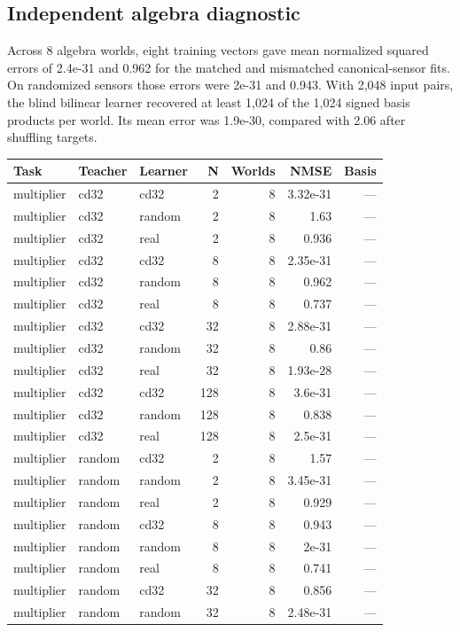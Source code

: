 \documentclass[10pt]{article}
\begin{document}
\subsection*{Independent algebra diagnostic}
Across 8 algebra worlds, eight training vectors gave mean normalized squared errors of 2.4e-31 and 0.962 for the matched and mismatched canonical-sensor fits. On randomized sensors those errors were 2e-31 and 0.943. With 2,048 input pairs, the blind bilinear learner recovered at least 1,024 of the 1,024 signed basis products per world. Its mean error was 1.9e-30, compared with 2.06 after shuffling targets.
\begin{longtable}{lllrrrr}
\hline Task & Teacher & Learner & N & Worlds & NMSE & Basis\\\hline\endhead\hline\endfoot
multiplier & cd32 & cd32 & 2 & 8 & 3.32e-31 & ---\\
multiplier & cd32 & random & 2 & 8 & 1.63 & ---\\
multiplier & cd32 & real & 2 & 8 & 0.936 & ---\\
multiplier & cd32 & cd32 & 8 & 8 & 2.35e-31 & ---\\
multiplier & cd32 & random & 8 & 8 & 0.962 & ---\\
multiplier & cd32 & real & 8 & 8 & 0.737 & ---\\
multiplier & cd32 & cd32 & 32 & 8 & 2.88e-31 & ---\\
multiplier & cd32 & random & 32 & 8 & 0.86 & ---\\
multiplier & cd32 & real & 32 & 8 & 1.93e-28 & ---\\
multiplier & cd32 & cd32 & 128 & 8 & 3.6e-31 & ---\\
multiplier & cd32 & random & 128 & 8 & 0.838 & ---\\
multiplier & cd32 & real & 128 & 8 & 2.5e-31 & ---\\
multiplier & random & cd32 & 2 & 8 & 1.57 & ---\\
multiplier & random & random & 2 & 8 & 3.45e-31 & ---\\
multiplier & random & real & 2 & 8 & 0.929 & ---\\
multiplier & random & cd32 & 8 & 8 & 0.943 & ---\\
multiplier & random & random & 8 & 8 & 2e-31 & ---\\
multiplier & random & real & 8 & 8 & 0.741 & ---\\
multiplier & random & cd32 & 32 & 8 & 0.856 & ---\\
multiplier & random & random & 32 & 8 & 2.48e-31 & ---\\

\end{longtable}
\end{document}
